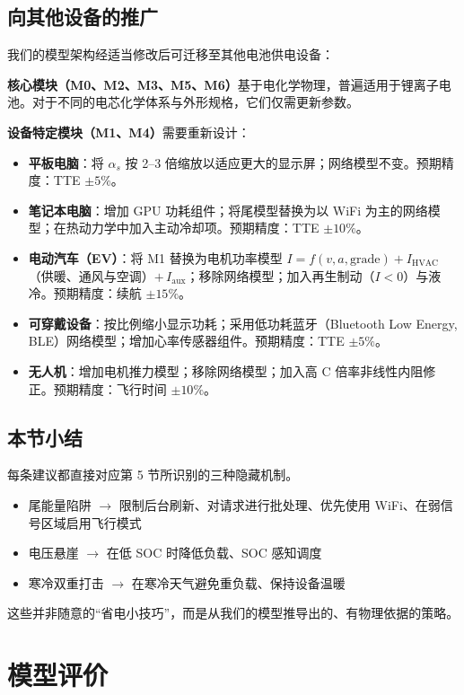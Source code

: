 \documentclass[11pt,a4paper]{ctexart}
\begin{document}
\subsection{向其他设备的推广}

我们的模型架构经适当修改后可迁移至其他电池供电设备：

\textbf{核心模块（M0、M2、M3、M5、M6）}基于电化学物理，普遍适用于锂离子电池。对于不同的电芯化学体系与外形规格，它们仅需更新参数。

\textbf{设备特定模块（M1、M4）}需要重新设计：
\begin{itemize}[leftmargin=2em]
\item \textbf{平板电脑}：将 $\alpha_s$ 按 2--3 倍缩放以适应更大的显示屏；网络模型不变。预期精度：TTE $\pm 5\%$。
\item \textbf{笔记本电脑}：增加 GPU 功耗组件；将尾模型替换为以 WiFi 为主的网络模型；在热动力学中加入主动冷却项。预期精度：TTE $\pm 10\%$。
\item \textbf{电动汽车（EV）}：将 M1 替换为电机功率模型 $I = f(v, a, \mathrm{grade}) + I_{\mathrm{HVAC}}$（供暖、通风与空调）$+\,I_{\mathrm{aux}}$；移除网络模型；加入再生制动（$I<0$）与液冷。预期精度：续航 $\pm 15\%$。
\item \textbf{可穿戴设备}：按比例缩小显示功耗；采用低功耗蓝牙（Bluetooth Low Energy, BLE）网络模型；增加心率传感器组件。预期精度：TTE $\pm 5\%$。
\item \textbf{无人机}：增加电机推力模型；移除网络模型；加入高 C 倍率非线性内阻修正。预期精度：飞行时间 $\pm 10\%$。
\end{itemize}

\subsection{本节小结}

每条建议都直接对应第 5 节所识别的三种隐藏机制。
\begin{itemize}[leftmargin=2em]
\item 尾能量陷阱 $\to$ 限制后台刷新、对请求进行批处理、优先使用 WiFi、在弱信号区域启用飞行模式
\item 电压悬崖 $\to$ 在低 SOC 时降低负载、SOC 感知调度
\item 寒冷双重打击 $\to$ 在寒冷天气避免重负载、保持设备温暖
\end{itemize}
这些并非随意的“省电小技巧”，而是从我们的模型推导出的、有物理依据的策略。

\section{模型评价}
\end{document}
